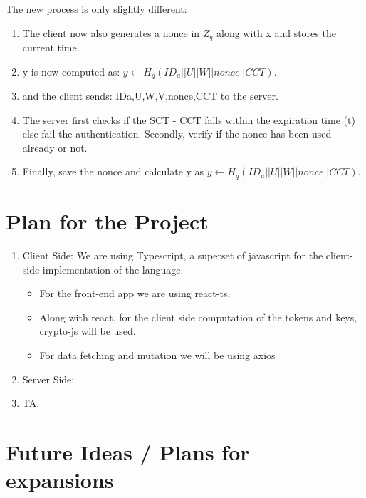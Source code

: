 \documentclass[]{article}   %
\begin{document}
The new process is only slightly different: 
\begin{enumerate}
    \item The client now also generates a nonce in $Z_q$ along with x and stores the current time.
    \item y is now computed as: $y \leftarrow H_q (ID_a || U || W || nonce || CCT).$
    \item and the client sends: {IDa,U,W,V,nonce,CCT} to the server.
    \item The server first checks if the SCT - CCT falls within the expiration time (t) else fail the authentication. Secondly, verify if the nonce has been used already or not. 
    \item Finally, save the nonce and calculate y as \newline $y \leftarrow H_q (ID_a || U || W || nonce || CCT).$
\end{enumerate}

\newpage
\section*{Plan for the Project}
\begin{enumerate}
    \item Client Side:
      We are using Typescript, a superset of javascript for the client-side implementation of the language.
    \begin{itemize}
      \item For the front-end app we are using react-ts.
      \item Along with react, for the client side computation of the tokens and keys, \href{https://www.npmjs.com/package/crypto-js}{ crypto-js } will be used.
      \item For data fetching and mutation we will be using \href{https://www.npmjs.com/package/axios}{ axios }
    \end{itemize}
    \item Server Side:
    \item TA:
\end{enumerate}
\newpage
\section*{Future Ideas / Plans for expansions}


\nocite{*}


\end{document}
